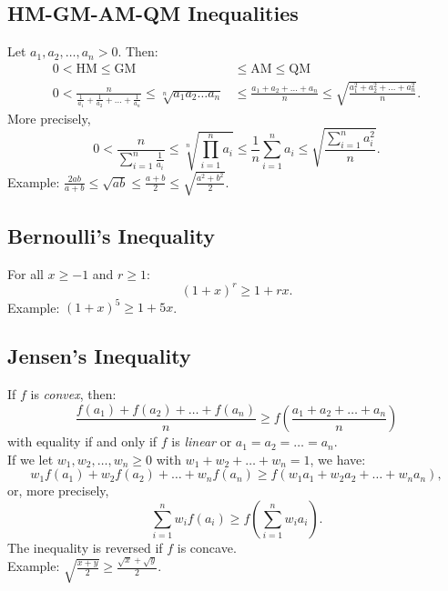 \documentclass[a4paper,11pt]{article}
\begin{document}
\subsection{HM-GM-AM-QM Inequalities}
\begin{tcolorbox}
    Let $a_1, a_2, \dots, a_n > 0$. Then:
    \begin{align*}
        0 < \text{HM} \leq \text{GM} &\leq \text{AM} \leq \text{QM} \\
        0 < \frac{n}{\frac{1}{a_1} + \frac{1}{a_2} + \dots + \frac{1}{a_n}} \leq \sqrt[n]{a_1 a_2 \dots a_n} &\leq \frac{a_1 + a_2 + \dots + a_n}{n} \leq \sqrt{\frac{a_1^2 + a_2^2 + \dots + a_n^2}{n}}.
    \end{align*}
    More precisely,
    \[
    0 < \frac{n}{\sum_{i=1}^n \frac{1}{a_i}} \leq \sqrt[n]{\prod_{i=1}^n a_i} \leq \frac{1}{n} \sum_{i=1}^n a_i \leq \sqrt{\frac{\sum_{i=1}^n a_i^2}{n}}.
    \]
    Example: $\textstyle \frac{2ab}{a+b} \leq \sqrt{ab} \leq \frac{a+b}{2} \leq \sqrt{\frac{a^2+b^2}{2}}$.
\end{tcolorbox}


\subsection{Bernoulli’s Inequality}
\begin{tcolorbox}
    For all $x \geq -1$ and $r \geq 1$:
    \[
    (1 + x)^r \geq 1 + rx.
    \]
    Example: $\textstyle (1+x)^5 \geq 1+5x$.
\end{tcolorbox}


\subsection{Jensen's Inequality}
\begin{tcolorbox}
    If $f$ is \emph{convex}, then:
    \[
    \frac{f(a_1) + f(a_2) + \dots + f(a_n)}{n} \geq f \left(\frac{a_1 + a_2 + \dots + a_n}{n} \right)
    \]
    with equality if and only if $f$ is \emph{linear} or $a_1 = a_2 = \dots = a_n$. \\[6pt]
    If we let $w_1, w_2, \dots, w_n \geq 0$ with $w_1 + w_2 + \dots + w_n = 1$, we have:
    \[
    w_1 f(a_1) + w_2 f(a_2) + \dots + w_n f(a_n) \geq f(w_1a_1 + w_2a_2 + \dots + w_na_n),
    \]
    or, more precisely,
    \[
    \sum_{i=1}^n w_i f(a_i) \geq f \left( \sum_{i=1}^n w_ia_i \right).
    \]
    The inequality is reversed if $f$ is concave. \\[6pt]
    Example: $\textstyle \sqrt{\frac{x+y}{2}} \geq \frac{\sqrt{x} + \sqrt{y}}{2}$.
\end{tcolorbox}
\end{document}
